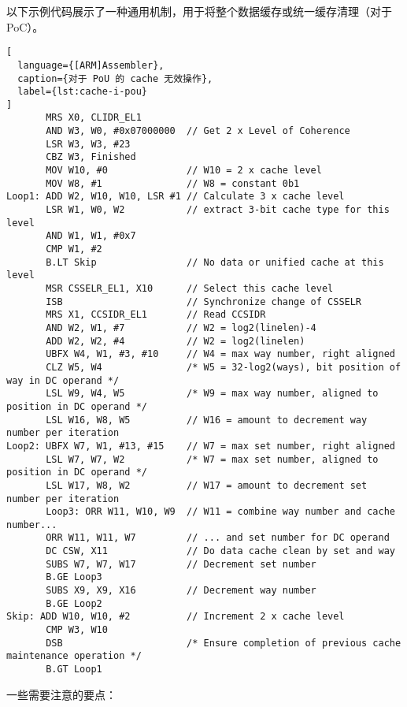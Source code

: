 以下示例代码展示了一种通用机制，用于将整个数据缓存或统一缓存清理（对于 PoC）。

\begin{lstlisting}[
  language={[ARM]Assembler},
  caption={对于 PoU 的 cache 无效操作},
  label={lst:cache-i-pou}
]
       MRS X0, CLIDR_EL1
       AND W3, W0, #0x07000000  // Get 2 x Level of Coherence
       LSR W3, W3, #23
       CBZ W3, Finished
       MOV W10, #0              // W10 = 2 x cache level
       MOV W8, #1               // W8 = constant 0b1
Loop1: ADD W2, W10, W10, LSR #1 // Calculate 3 x cache level
       LSR W1, W0, W2           // extract 3-bit cache type for this level
       AND W1, W1, #0x7
       CMP W1, #2
       B.LT Skip                // No data or unified cache at this level
       MSR CSSELR_EL1, X10      // Select this cache level
       ISB                      // Synchronize change of CSSELR
       MRS X1, CCSIDR_EL1       // Read CCSIDR
       AND W2, W1, #7           // W2 = log2(linelen)-4
       ADD W2, W2, #4           // W2 = log2(linelen)
       UBFX W4, W1, #3, #10     // W4 = max way number, right aligned
       CLZ W5, W4               /* W5 = 32-log2(ways), bit position of way in DC operand */
       LSL W9, W4, W5           /* W9 = max way number, aligned to position in DC operand */
       LSL W16, W8, W5          // W16 = amount to decrement way number per iteration
Loop2: UBFX W7, W1, #13, #15    // W7 = max set number, right aligned
       LSL W7, W7, W2           /* W7 = max set number, aligned to position in DC operand */
       LSL W17, W8, W2          // W17 = amount to decrement set number per iteration
       Loop3: ORR W11, W10, W9  // W11 = combine way number and cache number...
       ORR W11, W11, W7         // ... and set number for DC operand
       DC CSW, X11              // Do data cache clean by set and way
       SUBS W7, W7, W17         // Decrement set number
       B.GE Loop3
       SUBS X9, X9, X16         // Decrement way number
       B.GE Loop2
Skip: ADD W10, W10, #2          // Increment 2 x cache level
       CMP W3, W10
       DSB                      /* Ensure completion of previous cache maintenance operation */
       B.GT Loop1
\end{lstlisting}

一些需要注意的要点：

